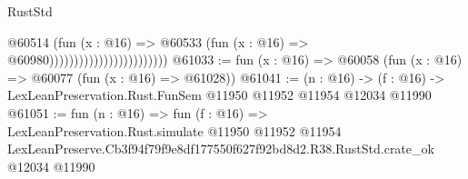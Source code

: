 \begin{lexlean}{RustStd}
\begin{coremodule}
                                              @60514
                                                (fun (x : @16) =>
                                                @60533
                                                  (fun (x : @16) => @60980))))))))))))))))))))))))
@61033 := fun (x : @16) => @60058 (fun (x : @16) => @60077 (fun (x : @16) => @61028))
@61041 := (n : @16) ->
  (f : @16) -> LexLeanPreservation.Rust.FunSem @11950 @11952 @11954 @12034 @11990
@61051 := fun (n : @16) =>
  fun (f : @16) =>
  LexLeanPreservation.Rust.simulate
    @11950
    @11952
    @11954
    LexLeanPreserve.Cb3f94f79f9e8df177550f627f92bd8d2.R38.RustStd.crate_ok
    @12034
    @11990
\end{coremodule}
\end{lexlean}
